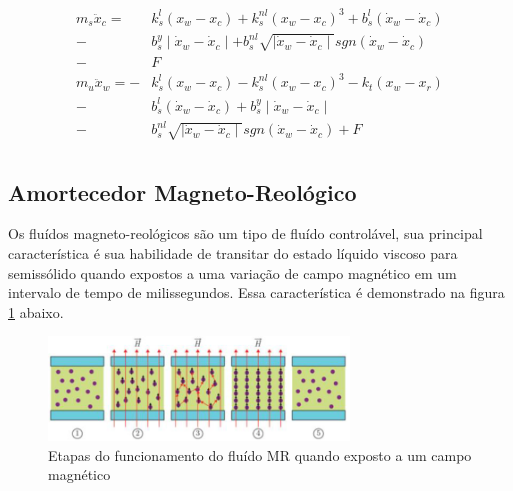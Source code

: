 \documentclass[a4paper]{ifacconf}
\begin{document}
        \begin{equation} \label{eq:massa_mola_nao_linear}
        \begin{aligned}
         m_{s} \ddot{x}_{c} =\ \ &k^{l}_{s}(x_{w}-x_{c})+k^{nl}_{s}(x_{w}-x_{c})^{3}+b^{l}_{s}(\dot{x}_{w}-\dot{x}_{c})\\
                            -&b^{y}_{s}\mid\dot{x}_{w}-\dot{x}_{c}\mid+b^{nl}_{s}\sqrt{\mid\dot{x}_{w}-\dot{x}_{c}\mid}sgn(\dot{x}_{w}-\dot{x}_{c})\\ 
                            -&F\\
         m_{u} \ddot{x}_{w} =-&k^{l}_{s}(x_{w}-x_{c})-k^{nl}_{s}(x_{w}-x_{c})^{3}-k_{t}(x_{w}-x_{r})\\ 
                            -&b^{l}_{s}(\dot{x}_{w}-\dot{x}_{c})+b^{y}_{s}\mid\dot{x}_{w}-\dot{x}_{c}\mid\\
                            -&b^{nl}_{s}\sqrt{\mid\dot{x}_{w}-\dot{x}_{c}\mid}sgn(\dot{x}_{w}-\dot{x}_{c})+F\\
        \end{aligned}
    \end{equation}
    
    \subsection{Amortecedor Magneto-Reológico}
    Os fluídos magneto-reológicos são um tipo de fluído controlável, sua principal característica é sua habilidade de transitar do estado líquido viscoso para semissólido quando expostos a uma variação de campo magnético em um intervalo de tempo de  milissegundos. Essa característica é demonstrado na figura \ref{fig:fluido_MR} abaixo.
    
    \FloatBarrier
    \begin{figure}[htbp]
        \begin{centering}
            \includegraphics[width=8cm]{img/fluido_MR.png}
            \caption{Etapas do funcionamento do fluído MR quando exposto a um campo magnético} 
            \label{fig:fluido_MR}
        \end{centering}
    \end{figure}
    \FloatBarrier
    
\end{document}

